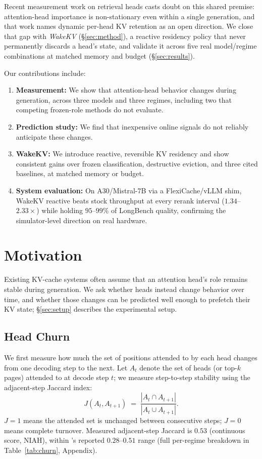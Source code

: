 \documentclass{article}
\begin{document}
Recent measurement work on retrieval heads \cite{retrievalheadsdynamic}
casts doubt on this shared premise: attention-head importance is
non-stationary even within a single generation, and that work names
dynamic per-head KV retention as an open direction. We close that gap
with \emph{WakeKV} (\S\ref{sec:method}), a reactive residency policy
that never permanently discards a head's state, and validate it across
five real model/regime combinations at matched memory and budget
(\S\ref{sec:results}).

Our contributions include:
\begin{enumerate}[leftmargin=1.4em,itemsep=1pt,topsep=2pt]
\item \textbf{Measurement:} We show that attention-head behavior
changes during generation, across three models and three regimes,
including two that competing frozen-role methods do not evaluate.
\item \textbf{Prediction study:} We find that inexpensive online
signals do not reliably anticipate these changes.
\item \textbf{WakeKV:} We introduce reactive, reversible KV residency
and show consistent gains over frozen classification, destructive
eviction, and three cited baselines, at matched memory or budget.
\item \textbf{System evaluation:} On A30/Mistral-7B via a
FlexiCache/vLLM shim, WakeKV reactive beats stock throughput at every
rerank interval ($1.34$--$2.33\times$) while holding $95$--$99\%$ of
LongBench quality, confirming the simulator-level direction on real
hardware.
\end{enumerate}

\section{Motivation}
\label{sec:motivation}

Existing KV-cache systems often assume that an attention head's role
remains stable during generation. We ask whether heads instead change
behavior over time, and whether those changes can be predicted well
enough to prefetch their KV state; \S\ref{sec:setup} describes the
experimental setup.

\subsection{Head Churn}
We first measure how much the set of positions attended to by each head changes from one decoding step to the next. Let $A_t$ denote the set of heads (or top-$k$ pages) attended to at
decode step $t$; we measure step-to-step stability using the
adjacent-step Jaccard index:
\begin{equation}
J(A_t, A_{t+1}) \;=\; \frac{|A_t \cap A_{t+1}|}{|A_t \cup A_{t+1}|}.
\label{eq:jaccard}
\end{equation}
$J=1$ means the attended set is unchanged between consecutive steps;
$J=0$ means complete turnover. Measured adjacent-step Jaccard is $0.53$
(continuous score, NIAH), within \cite{retrievalheadsdynamic}'s reported
$0.28$--$0.51$ range (full per-regime breakdown in
Table~\ref{tab:churn}, Appendix).
\end{document}
